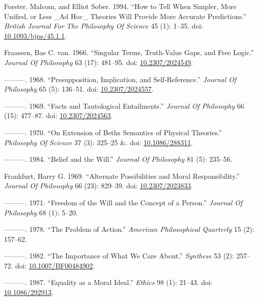 \documentclass[
  10pt,
  letterpaper,
  DIV=11,
  numbers=noendperiod,
  twoside]{scrartcl}
\newlength{\cslhangindent}
\newenvironment{CSLReferences}[2] %
 {\begin{list}{}{%
  \setlength{\itemindent}{0pt}
  \setlength{\leftmargin}{0pt}
  \setlength{\parsep}{0pt}
  \ifodd #1
   \setlength{\leftmargin}{\cslhangindent}
   \setlength{\itemindent}{-1\cslhangindent}
  \fi
  \setlength{\itemsep}{#2\baselineskip}}}
 {\end{list}}
\begin{document}
\begin{CSLReferences}{1}{0}
Forster, Malcom, and Elliot Sober. 1994. {``How to Tell When Simpler,
More Unified, or Less \_Ad Hoc\_ Theories Will Provide More Accurate
Predictions.''} \emph{British Journal For The Philosophy Of Science} 45
(1): 1--35. doi:
\href{https://doi.org/10.1093/bjps/45.1.1}{10.1093/bjps/45.1.1}.

Fraassen, Bas C. van. 1966. {``Singular Terms, Truth-Value Gaps, and
Free Logic.''} \emph{Journal Of Philosophy} 63 (17): 481--95. doi:
\href{https://doi.org/10.2307/2024549}{10.2307/2024549}.

---------. 1968. {``Presupposition, Implication, and Self-Reference.''}
\emph{Journal Of Philosophy} 65 (5): 136--51. doi:
\href{https://doi.org/10.2307/2024557}{10.2307/2024557}.

---------. 1969. {``Facts and Tautological Entailments.''} \emph{Journal
Of Philosophy} 66 (15): 477--87. doi:
\href{https://doi.org/10.2307/2024563}{10.2307/2024563}.

---------. 1970. {``On Extension of Beths Semantics of Physical
Theories.''} \emph{Philosophy Of Science} 37 (3): 325--25 \&. doi:
\href{https://doi.org/10.1086/288311}{10.1086/288311}.

---------. 1984. {``Belief and the Will.''} \emph{Journal Of Philosophy}
81 (5): 235--56.

Frankfurt, Harry G. 1969. {``Alternate Possibilities and Moral
Responsibility.''} \emph{Journal Of Philosophy} 66 (23): 829--39. doi:
\href{https://doi.org/10.2307/2023833}{10.2307/2023833}.

---------. 1971. {``Freedom of the Will and the Concept of a Person.''}
\emph{Journal Of Philosophy} 68 (1): 5--20.

---------. 1978. {``The Problem of Action.''} \emph{American
Philosophical Quarterly} 15 (2): 157--62.

---------. 1982. {``The Importance of What We Care About.''}
\emph{Synthese} 53 (2): 257--72. doi:
\href{https://doi.org/10.1007/BF00484902}{10.1007/BF00484902}.

---------. 1987. {``Equality as a Moral Ideal.''} \emph{Ethics} 98 (1):
21--43. doi: \href{https://doi.org/10.1086/292913}{10.1086/292913}.


\end{CSLReferences}
\end{document}
